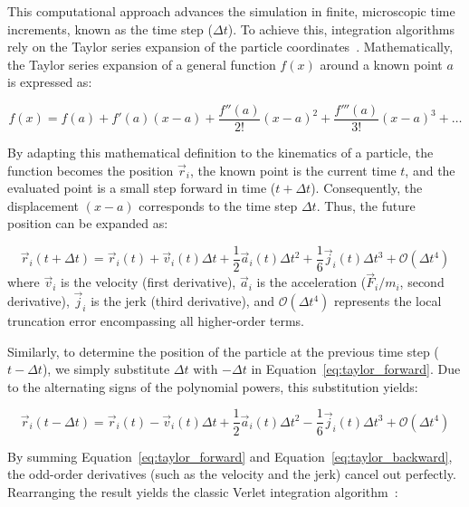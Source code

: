 This computational approach advances the simulation in finite, microscopic time increments, known as the time step ($\Delta t$). To achieve this, integration algorithms rely on the Taylor series expansion of the particle coordinates~\cite{braun2018best,biblia_2}. Mathematically, the Taylor series expansion of a general function $f(x)$ around a known point $a$ is expressed as:

\begin{equation}\label{eq:taylor_general}
    f(x) = f(a) + f'(a)(x-a) + \frac{f''(a)}{2!}(x-a)^2 + \frac{f'''(a)}{3!}(x-a)^3 + \dots
\end{equation}

By adapting this mathematical definition to the kinematics of a particle, the function becomes the position $\vec{r}_i$, the known point is the current time $t$, and the evaluated point is a small step forward in time ($t + \Delta t$). Consequently, the displacement $(x-a)$ corresponds to the time step $\Delta t$. Thus, the future position can be expanded as:

\begin{equation}\label{eq:taylor_forward}
    \vec{r}_i(t + \Delta t) = \vec{r}_i(t) + \vec{v}_i(t)\Delta t + \frac{1}{2}\vec{a}_i(t)\Delta t^2 + \frac{1}{6}\vec{j}_i(t)\Delta t^3 + \mathcal{O}(\Delta t^4)
\end{equation}
where $\vec{v}_i$ is the velocity (first derivative), $\vec{a}_i$ is the acceleration ($\vec{F}_i/m_i$, second derivative), $\vec{j}_i$ is the jerk (third derivative), and $\mathcal{O}(\Delta t^4)$ represents the local truncation error encompassing all higher-order terms. 

Similarly, to determine the position of the particle at the previous time step ($t - \Delta t$), we simply substitute $\Delta t$ with $-\Delta t$ in Equation~\ref{eq:taylor_forward}. Due to the alternating signs of the polynomial powers, this substitution yields:

\begin{equation}\label{eq:taylor_backward}
    \vec{r}_i(t - \Delta t) = \vec{r}_i(t) - \vec{v}_i(t)\Delta t + \frac{1}{2}\vec{a}_i(t)\Delta t^2 - \frac{1}{6}\vec{j}_i(t)\Delta t^3 + \mathcal{O}(\Delta t^4)
\end{equation}

By summing Equation~\ref{eq:taylor_forward} and Equation~\ref{eq:taylor_backward}, the odd-order derivatives (such as the velocity and the jerk) cancel out perfectly. Rearranging the result yields the classic Verlet integration algorithm~\cite{Verlet1967}:


